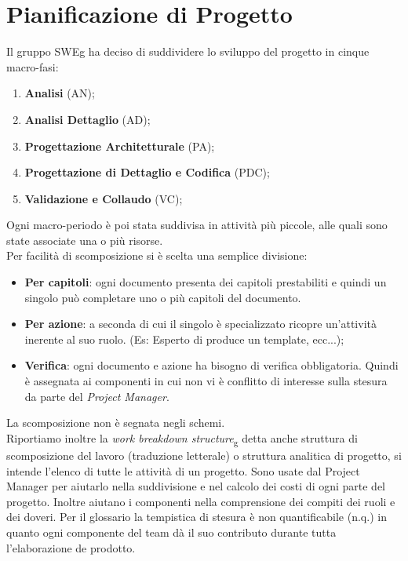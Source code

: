 \documentclass[12pt,a4paper,titlepage]{article}
\begin{document}
			
	\newpage	
	
	\section{Pianificazione di Progetto}
	Il gruppo SWEg ha deciso di suddividere lo sviluppo del progetto in cinque macro-fasi:
	\begin{enumerate}
		\item \textbf{Analisi} (AN);
		\item \textbf{Analisi Dettaglio} (AD);
		\item \textbf{Progettazione Architetturale} (PA);
		\item \textbf{Progettazione di Dettaglio e Codifica} (PDC);
		\item \textbf{Validazione e Collaudo} (VC);
	\end{enumerate}
	Ogni macro-periodo è poi stata suddivisa in attività più piccole, alle quali sono state associate una o più risorse. \\
	Per facilità di scomposizione si è scelta una semplice divisione:
	\begin{itemize}
		\item \textbf{Per capitoli}: ogni documento presenta dei capitoli prestabiliti e quindi un singolo può completare uno o più capitoli del documento.
		\item \textbf{Per azione}: a seconda di cui il singolo è specializzato ricopre un'attività inerente al suo ruolo. (Es: Esperto di produce un template, ecc...);
		\item \textbf{Verifica}: ogni documento e azione ha bisogno di verifica obbligatoria. Quindi è assegnata ai componenti in cui non vi è conflitto di interesse sulla stesura da parte del \textit{Project Manager}.
	\end{itemize} 
	La scomposizione non è segnata negli schemi.\\
	Riportiamo inoltre la \textit{work breakdown structure}\textsubscript{g} detta anche struttura di scomposizione del lavoro (traduzione letterale) o struttura analitica di progetto, si intende l'elenco di tutte le attività di un progetto. Sono usate dal Project Manager per aiutarlo nella suddivisione e nel calcolo dei costi di ogni parte del progetto. Inoltre aiutano i componenti nella comprensione dei compiti dei ruoli e dei doveri.
	Per il glossario la tempistica di stesura è non quantificabile (n.q.) in quanto ogni componente del team dà il suo contributo durante tutta l'elaborazione de prodotto.
	
\end{document}
